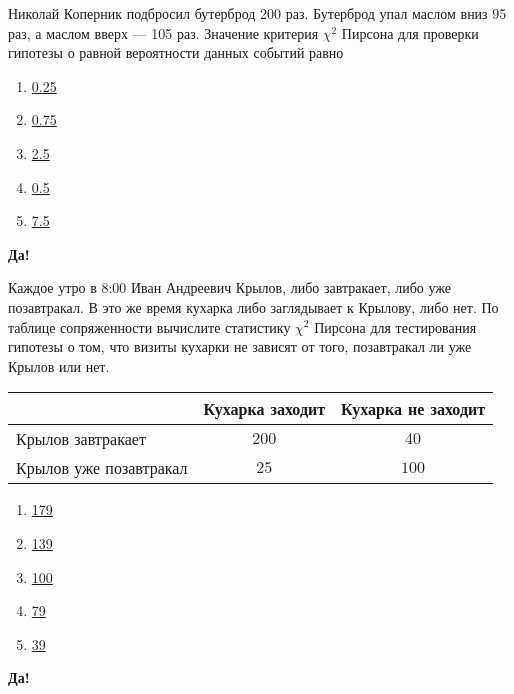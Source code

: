 \documentclass[t]{beamer}
\begin{document}
 \begin{frame} \label{15-Yes} 
\begin{block}{15} 

Николай Коперник подбросил бутерброд 200 раз. Бутерброд упал маслом вниз 95 раз, а маслом вверх — 105 раз. Значение критерия $\chi^2$ Пирсона для проверки гипотезы о равной вероятности данных событий равно
 


 \end{block} 
\begin{enumerate} 
\item[] \hyperlink{15-No}{\beamergotobutton{} 0.25}
\item[] \hyperlink{15-No}{\beamergotobutton{} 0.75}
\item[] \hyperlink{15-No}{\beamergotobutton{} 2.5}
\item[] \hyperlink{15-Yes}{\beamergotobutton{} 0.5}
\item[] \hyperlink{15-No}{\beamergotobutton{} 7.5}
\end{enumerate} 

 \textbf{Да!} 
 \hyperlink{16}{}\end{frame} 


 \begin{frame} \label{16-Yes} 
\begin{block}{16} 

Каждое утро в 8:00 Иван Андреевич Крылов, либо завтракает, либо уже позавтракал. В это же время кухарка либо заглядывает к Крылову, либо нет. По таблице сопряженности вычислите  статистику $\chi^2$ Пирсона для тестирования гипотезы о том, что визиты кухарки не зависят от того, позавтракал ли уже Крылов или нет.

\begin{tabular}{@{}l|cc@{}}
\toprule
                       & Кухарка заходит & Кухарка не заходит \\ \midrule
Крылов завтракает      & $200$           & $40$               \\
Крылов уже позавтракал & $25$            & $100$              \\ \bottomrule
\end{tabular}

 


 \end{block} 
\begin{enumerate} 
\item[] \hyperlink{16-No}{\beamergotobutton{} 179}
\item[] \hyperlink{16-Yes}{\beamergotobutton{} 139}
\item[] \hyperlink{16-No}{\beamergotobutton{} 100}
\item[] \hyperlink{16-No}{\beamergotobutton{} 79}
\item[] \hyperlink{16-No}{\beamergotobutton{} 39}
\end{enumerate} 

 \textbf{Да!} 
 \hyperlink{17}{}\end{frame} 
\end{document}
